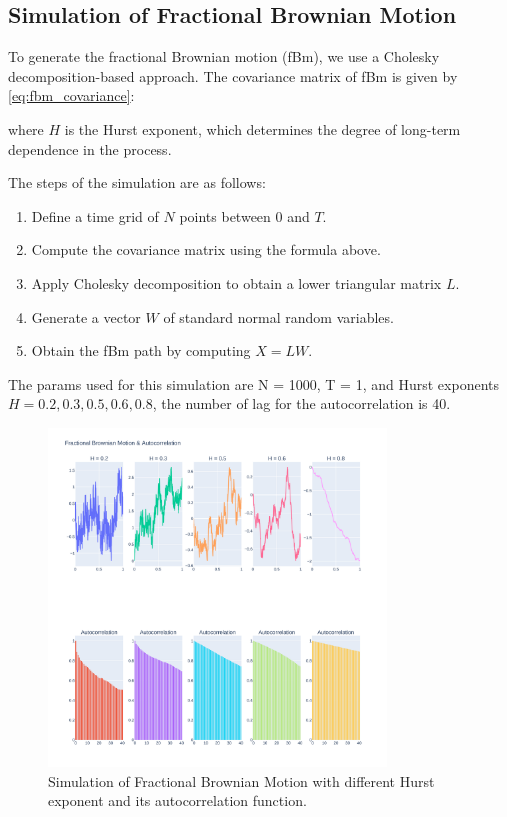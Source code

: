 \documentclass[11pt]{extarticle}
\begin{document}
\subsection{Simulation of Fractional Brownian Motion}

To generate the fractional Brownian motion (fBm), we use a Cholesky decomposition-based approach. The covariance matrix of fBm is given by \eqref{eq:fbm_covariance}:

where \( H \) is the Hurst exponent, which determines the degree of long-term dependence in the process.

The steps of the simulation are as follows:
\begin{enumerate}
    \item Define a time grid of \( N \) points between \( 0 \) and \( T \).
    \item Compute the covariance matrix using the formula above.
    \item Apply Cholesky decomposition to obtain a lower triangular matrix \( L \).
    \item Generate a vector \( W \) of standard normal random variables.
    \item Obtain the fBm path by computing \( X = L W \).
\end{enumerate}

The params used for this simulation are N = 1000, T = 1, and Hurst exponents \( H = 0.2, 0.3, 0.5, 0.6, 0.8 \), the number
of lag for the autocorrelation is 40.

\begin{figure}[!ht]
    \centering
    \includegraphics[width=0.8\textwidth]{img/fdm_autocorr}
    \caption{Simulation of Fractional Brownian Motion with different Hurst exponent and its autocorrelation function.}
    \label{fig:fbm_autocorr}
\end{figure}
\end{document}
